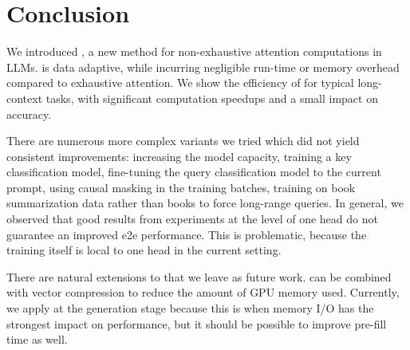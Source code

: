 \section{Conclusion}

We introduced \OURS, a new method for non-exhaustive attention computations in LLMs. 
\OURS is data adaptive, while incurring negligible run-time or memory overhead compared to exhaustive attention. 
We show the efficiency of \OURS for typical long-context tasks, with significant computation speedups and a small impact on accuracy.


There are numerous more complex variants we tried which did not yield consistent improvements: 
increasing the model capacity, 
training a key classification model, 
fine-tuning the query classification model to the current prompt, 
using causal masking in the training batches, 
training on book summarization data rather than books to force long-range queries. 
In general, we observed that good results from experiments at the level of one head do not guarantee an improved e2e performance. 
This is problematic, because the training itself is local to one head in the current setting. 

%
There are natural extensions to \OURS that we leave as future work. 
\OURS can be combined with vector compression to reduce the amount of GPU memory used. 
Currently, we apply \OURS at the generation stage because this is when memory I/O has the strongest impact on performance, but it should be possible to improve pre-fill time as well. 
%




%

%

